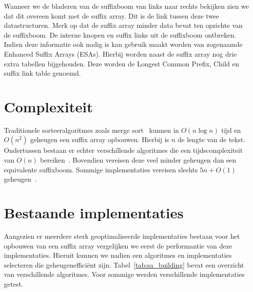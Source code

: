Wanneer we de bladeren van de suffixboom van links naar rechts bekijken zien we dat dit overeen komt met de suffix array.
Dit is de link tussen deze twee datastructuren.
Merk op dat de suffix array minder data bevat ten opzichte van de suffixboom.
De interne knopen en suffix links uit de suffixboom ontbreken.
Indien deze informatie ook nodig is kan gebruik maakt worden van zogenaamde Enhanced Suffix Arrays (ESAs).
Hierbij worden naast de suffix array nog drie extra tabellen bijgehouden.
Deze worden de Longest Common Prefix, Child en suffix link table genoemd.


\section{Complexiteit}\label{sec:complexiteit}
Traditionele sorteeralgoritmes zoals merge sort~\cite{mergeSort} kunnen in $O(n \log n)$ tijd en $O(n^2)$ geheugen een suffix array opbouwen.
Hierbij is $n$ de lengte van de tekst.
Ondertussen bestaan er echter verschillende algoritmes die een tijdscomplexiteit van $O(n)$ bereiken~\cite{sais, ko_alura, radixSA, dark_archon, libdivsufsort}.
Bovendien vereisen deze veel minder geheugen dan een equivalente suffixboom.
Sommige implementaties vereisen slechts $5n + O(1)$ geheugen~\cite{dark_archon, libdivsufsort}.


\section{Bestaande implementaties}\label{sec:bestaande-implementaties}
Aangezien er meerdere sterk geoptimaliseerde implementaties bestaan voor het opbouwen van een suffix array vergelijken we eerst de performantie van deze implementaties.
Hieruit kunnen we nadien een algoritmes en implementaties selecteren die geheugenefficiënt zijn.
Tabel~\ref{tab:sa_building} bevat een overzicht van verschillende algoritmes.
Voor sommige werden verschillende implementaties getest.

